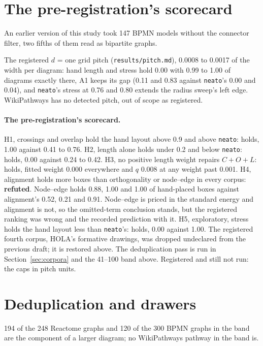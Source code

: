 \documentclass[a4paper,UKenglish]{gd-lipics-v3}
\begin{document}
\section{The pre-registration's scorecard}\label{app:prereg}

An earlier version of this study took 147 BPMN models without the connector filter,
two fifths of them read as bipartite graphs.

The registered $d$ = one grid pitch (\texttt{results/pitch.md}), 0.0008 to 0.0017 of
the width per diagram: hand length and stress hold 0.00 with 0.99 to 1.00 of diagrams
exactly there, A1 keeps its gap (0.11 and 0.83 against \texttt{neato}'s 0.00 and 0.04),
and \texttt{neato}'s stress at 0.76 and 0.80 extends the radius sweep's left edge.
WikiPathways has no detected pitch, out of scope as registered.

\paragraph{The pre-registration's scorecard.} H1, crossings and overlap hold the hand
layout above 0.9 and above \texttt{neato}: holds, 1.00 against 0.41 to 0.76. H2, length
alone holds under 0.2 and below \texttt{neato}: holds, 0.00 against 0.24 to 0.42. H3, no
positive length weight repairs $C{+}O{+}L$: holds, fitted weight 0.000 everywhere and $q$
0.008 at any weight past 0.001. H4, alignment holds more boxes than orthogonality or
node--edge in every corpus: \textbf{refuted}. Node--edge holds 0.88, 1.00 and 1.00 of
hand-placed boxes against alignment's 0.52, 0.21 and 0.91. Node--edge is priced in the
standard energy and alignment is not, so the omitted-term conclusion stands, but the
registered ranking was wrong and the recorded prediction with it. H5, exploratory, stress
holds the hand layout less than \texttt{neato}'s: holds, 0.00 against 1.00. The registered
fourth corpus, HOLA's formative drawings, was dropped undeclared from the previous draft;
it is restored above. The deduplication pass is run in Section~\ref{sec:corpora} and
the 41--100 band above. Registered and still not run: the caps in pitch units.

\section{Deduplication and drawers}\label{app:dedup}

194 of the 248 Reactome graphs and 120 of the 300 BPMN graphs in the band are the
component of a larger diagram; no WikiPathways pathway in the band is.
\end{document}
